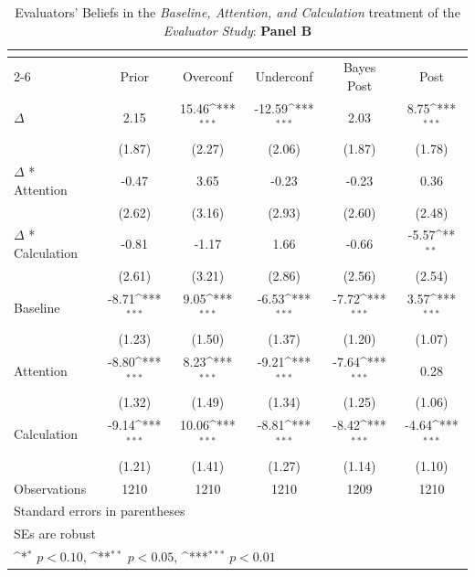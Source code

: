 \begin{table}[htbp]\centering
\def\sym#1{\ifmmode^{#1}\else\(^{#1}\)\fi}
\caption{Evaluators' Beliefs in the \textit{Baseline, Attention, and Calculation} treatment of the \textit{Evaluator Study}: \textbf{Panel B}}
\begin{tabular}{l*{5}{c}}
\hline\hline
                &\multicolumn{5}{c}{}                                                                          \\\cmidrule(lr){2-6}
                &\multicolumn{1}{c}{Prior}&\multicolumn{1}{c}{Overconf}&\multicolumn{1}{c}{Underconf}&\multicolumn{1}{c}{Bayes Post}&\multicolumn{1}{c}{Post}\\
\hline
$\Delta$        &     2.15         &    15.46\sym{***}&   -12.59\sym{***}&     2.03         &     8.75\sym{***}\\
                &   (1.87)         &   (2.27)         &   (2.06)         &   (1.87)         &   (1.78)         \\
$\Delta$ * Attention&    -0.47         &     3.65         &    -0.23         &    -0.23         &     0.36         \\
                &   (2.62)         &   (3.16)         &   (2.93)         &   (2.60)         &   (2.48)         \\
$\Delta$ * Calculation&    -0.81         &    -1.17         &     1.66         &    -0.66         &    -5.57\sym{**} \\
                &   (2.61)         &   (3.21)         &   (2.86)         &   (2.56)         &   (2.54)         \\
Baseline        &    -8.71\sym{***}&     9.05\sym{***}&    -6.53\sym{***}&    -7.72\sym{***}&     3.57\sym{***}\\
                &   (1.23)         &   (1.50)         &   (1.37)         &   (1.20)         &   (1.07)         \\
Attention       &    -8.80\sym{***}&     8.23\sym{***}&    -9.21\sym{***}&    -7.64\sym{***}&     0.28         \\
                &   (1.32)         &   (1.49)         &   (1.34)         &   (1.25)         &   (1.06)         \\
Calculation     &    -9.14\sym{***}&    10.06\sym{***}&    -8.81\sym{***}&    -8.42\sym{***}&    -4.64\sym{***}\\
                &   (1.21)         &   (1.41)         &   (1.27)         &   (1.14)         &   (1.10)         \\
\hline
Observations    &     1210         &     1210         &     1210         &     1209         &     1210         \\
\hline\hline
\multicolumn{6}{l}{\footnotesize Standard errors in parentheses}\\
\multicolumn{6}{l}{\footnotesize SEs are robust}\\
\multicolumn{6}{l}{\footnotesize \sym{*} \(p<0.10\), \sym{**} \(p<0.05\), \sym{***} \(p<0.01\)}\\
\end{tabular}
\end{table}
